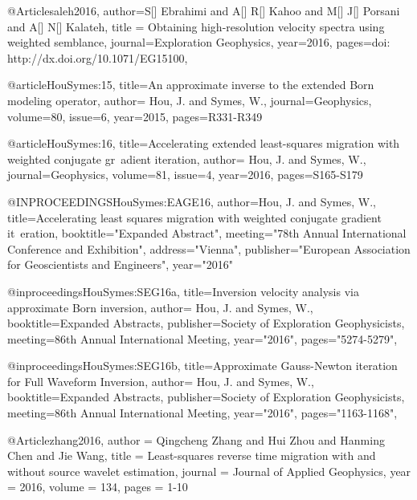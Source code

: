   

@Article{saleh2016,
  author={S[] Ebrahimi and A[] R[] Kahoo and M[] J[] Porsani and A[] N[] Kalateh},
  title = {Obtaining high-resolution velocity spectra using weighted semblance},
  journal={Exploration Geophysics},
  year=2016,
  pages={doi: http://dx.doi.org/10.1071/EG15100},
}

@article{HouSymes:15,
title={An approximate inverse to the extended {B}orn modeling operator},
author= {Hou, J. and Symes, W.},
journal={Geophysics},
volume={80},
issue={6},
year={2015},
pages={R331-R349}
}

@article{HouSymes:16,
title={Accelerating extended least-squares migration with weighted conjugate gr\
adient iteration},
author= {Hou, J. and Symes, W.},
journal={Geophysics},
volume={81},
issue={4},
year={2016},
pages={S165-S179}
}

@INPROCEEDINGS{HouSymes:EAGE16,
author={Hou, J. and Symes, W.},
title={Accelerating least squares migration with weighted conjugate gradient it\
eration},
booktitle="Expanded Abstract",
meeting="78th Annual International Conference and Exhibition",
address="Vienna",
publisher="European Association for Geoscientists and Engineers",
year="2016"}

@inproceedings{HouSymes:SEG16a,
title={Inversion velocity analysis via approximate Born inversion},
author= {Hou, J. and Symes, W.},
booktitle={Expanded Abstracts},
publisher={Society of Exploration Geophysicists},
meeting={86th Annual International Meeting},
year="2016",
pages="5274-5279",
}

@inproceedings{HouSymes:SEG16b,
title={Approximate Gauss-Newton iteration for Full Waveform Inversion},
author= {Hou, J. and Symes, W.},
booktitle={Expanded Abstracts},
publisher={Society of Exploration Geophysicists},
meeting={86th Annual International Meeting},
year="2016",
pages="1163-1168",
}

@Article{zhang2016,
  author = 	 {Qingcheng Zhang and Hui Zhou and Hanming Chen and Jie Wang},
  title = 	 {Least-squares reverse time migration with and without source wavelet estimation},
  journal = 	 {Journal of Applied Geophysics},
  year = 	 2016,
  volume = 	 134,
  pages = 	 {1-10}}
  

